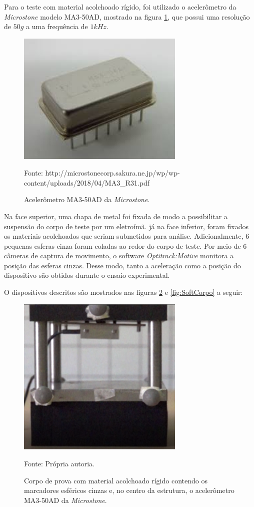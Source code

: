 Para o teste com material acolchoado rígido, foi utilizado o acelerômetro da \textit{Microstone} modelo MA3-50AD, mostrado na figura \ref{fig:microstone},  que possui uma resolução de $50g$ a uma frequência de $1kHz$.

 \begin{figure}[H]  
        \centering
        \caption{ Acelerômetro MA3-50AD da \textit{Microstone}.}
        \includegraphics[width=8cm]{./figs/microstone.jpeg}
        \par\medskip
        Fonte: http://microstonecorp.sakura.ne.jp/wp/wp-content/uploads/2018/04/MA3\_R31.pdf
        \label{fig:microstone}
\end{figure}

Na face superior, uma chapa de metal foi fixada de modo a possibilitar a suspensão do corpo de teste por um eletroímã. já na face inferior, foram fixados os materiais acolchoados que seriam submetidos para análise. Adicionalmente, 6 pequenas esferas cinza foram coladas ao redor do corpo de teste. Por meio de 6 câmeras de captura de movimento, o software \textit{Optitrack:Motive} monitora a posição das esferas cinzas. Desse modo, tanto a aceleração como a posição do dispositivo são obtidos durante o ensaio experimental.

O dispositivos descritos são mostrados nas figuras \ref{fig:CorpoDeProva2} e \ref{fig:SoftCorpo} a seguir:

 \begin{figure}[H]  
        \centering
        \caption{Corpo de prova com material acolchoado rígido contendo os marcadores esféricos cinzas e, no centro da estrutura, o acelerômetro MA3-50AD da \textit{Microstone}.}
        \includegraphics[width=8cm]{./figs/CorpoDeProva.PNG}
        \par\medskip
        Fonte: Própria autoria.
        \label{fig:CorpoDeProva2}
\end{figure}

